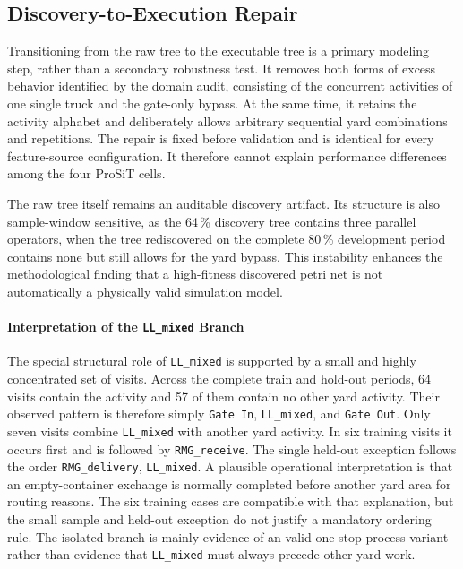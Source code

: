 \subsection{Discovery-to-Execution Repair}

Transitioning from the raw tree to the executable tree is a primary modeling
step, rather than a secondary robustness test. It removes both forms of excess
behavior identified by the domain audit, consisting of the concurrent activities of one single truck
and the gate-only bypass. At the same time, it retains the activity alphabet
and deliberately allows arbitrary sequential yard combinations and
repetitions. The repair is fixed before validation and is identical for every
feature-source configuration. It therefore cannot explain performance
differences among the four ProSiT cells.

The raw tree itself remains an auditable discovery artifact. Its structure is
also sample-window sensitive, as the 64\,\% discovery tree contains three
parallel operators, when the tree rediscovered on the complete 80\,\%
development period contains none but still allows for the yard bypass. This
instability enhances the methodological finding that a high-fitness
discovered petri net is not automatically a physically valid simulation model.

\paragraph{Interpretation of the \texttt{LL\_mixed} Branch}

The special structural role of \texttt{LL\_mixed} is supported by a small and
highly concentrated set of visits. Across the complete train and hold-out
periods, 64 visits contain the activity and 57 of them contain no other yard
activity. Their observed pattern is therefore simply \texttt{Gate In},
\texttt{LL\_mixed}, and \texttt{Gate Out}. Only seven visits combine
\texttt{LL\_mixed} with another yard activity. In six training visits it occurs
first and is followed by \texttt{RMG\_receive}. The single held-out exception
follows the order \texttt{RMG\_delivery}, \texttt{LL\_mixed}. A plausible
operational interpretation is that an empty-container exchange is normally
completed before another yard area for routing reasons. The six training cases
are compatible with that explanation, but the small sample and held-out
exception do not justify a mandatory ordering rule. The isolated branch is
mainly evidence of an valid one-stop process variant rather than evidence
that \texttt{LL\_mixed} must always precede other yard work.

